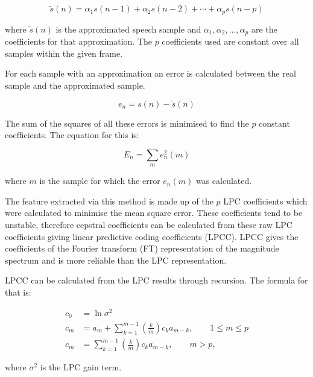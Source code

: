 \begin{equation}
    \tilde{s}(n) = \alpha_1s(n-1) + \alpha_2s(n-2) +\cdots+ \alpha_ps(n-p)
\end{equation}

where $\tilde{s}(n)$ is the approximated speech sample and $\alpha_1, \alpha_2, \ldots, \alpha_p$ are the coefficients 
for that approximation. The $p$ coefficients used are constant over all samples within the 
given frame.

For each sample with an approximation an error is calculated between the real sample 
and the approximated sample.

\begin{equation}
    e_n = s(n) - \tilde{s}(n)
\end{equation}

The sum of the squares of all these errors is minimised to find the $p$ constant coefficients. 
The equation for this is:

\begin{equation}
    E_n = \sum_m e_n^2(m)
\end{equation}

where $m$ is the sample for which the error $e_n(m)$ was calculated.

The feature extracted via this method is made up of the $p$ \acs{LPC} coefficients which were calculated 
to minimise the mean square error. These coefficients tend to be unstable, therefore cepstral 
coefficients can be calculated from these raw \acs{LPC} coefficients giving linear predictive coding coefficients (\acs{LPCC}). 
\acs{LPCC} gives 
the coefficients of the Fourier transform (\acs{FT}) representation of the magnitude spectrum and is more reliable 
than the \acs{LPC} representation. 

\acs{LPCC} can be calculated from the \acs{LPC} results through recursion. The formula for that 
is:

\begin{equation}
\begin{aligned}
c_0 &= \ln \sigma^2 \\
c_m &= a_m + \sum_{k=1}^{m-1} \left(\frac{k}{m}\right) c_k a_{m-k}, \qquad 1 \le m \le p \\
c_m &= \sum_{k=1}^{m-1} \left(\frac{k}{m}\right) c_k a_{m-k}, \qquad m > p,
\label{eq:lpcc}
\end{aligned}
\end{equation}

where $\sigma^2$ is the \acs{LPC} gain term.

